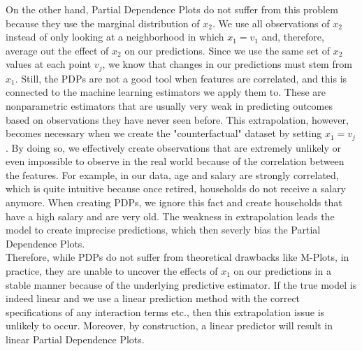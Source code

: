 On the other hand, Partial Dependence Plots do not suffer from this problem because they use the marginal distribution of $x_2$. We use all observations of $x_2$ instead of only looking at a neighborhood in which $x_1=v_1$ and, therefore, average out the effect of $x_2$ on our predictions. Since we use the same set of $x_2$ values at each point $v_j$, we know that changes in our predictions must stem from $x_1.$ Still, the PDPs are not a good tool when features are correlated, and this is connected to the machine learning estimators we apply them to. These are nonparametric estimators that are usually very weak in predicting outcomes based on observations they have never seen before. This extrapolation, however, becomes necessary when we create the "counterfactual" dataset by setting $x_1=v_j$. By doing so, we effectively create observations that are extremely unlikely or even impossible to observe in the real world because of the correlation between the features. For example, in our data, age and salary are strongly correlated, which is quite intuitive because once retired, households do not receive a salary anymore. When creating PDPs, we ignore this fact and create households that have a high salary and are very old. The weakness in extrapolation leads the model to create imprecise predictions, which then severly bias the Partial Dependence Plots. \citep{apleyzhu_2020}  \\
Therefore, while PDPs do not suffer from theoretical drawbacks like M-Plots, in practice, they are unable to uncover the effects of $x_1$ on our predictions in a stable manner because of the underlying predictive estimator. If the true model is indeed linear and we use a linear prediction method with the correct specifications of any interaction terms etc., then this extrapolation issue is unlikely to occur. Moreover, by construction, a linear predictor will result in linear Partial Dependence Plots. 

